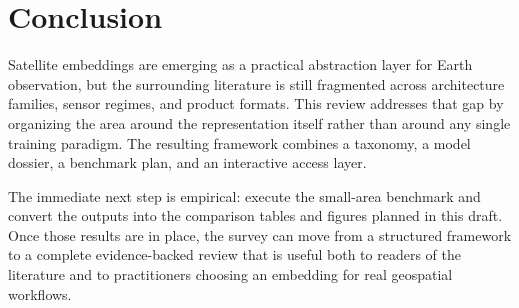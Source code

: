\section{Conclusion}

Satellite embeddings are emerging as a practical abstraction layer for Earth observation, but the surrounding literature is still fragmented across architecture families, sensor regimes, and product formats. This review addresses that gap by organizing the area around the representation itself rather than around any single training paradigm. The resulting framework combines a taxonomy, a model dossier, a benchmark plan, and an interactive access layer.

The immediate next step is empirical: execute the small-area benchmark and convert the outputs into the comparison tables and figures planned in this draft. Once those results are in place, the survey can move from a structured framework to a complete evidence-backed review that is useful both to readers of the literature and to practitioners choosing an embedding for real geospatial workflows.
